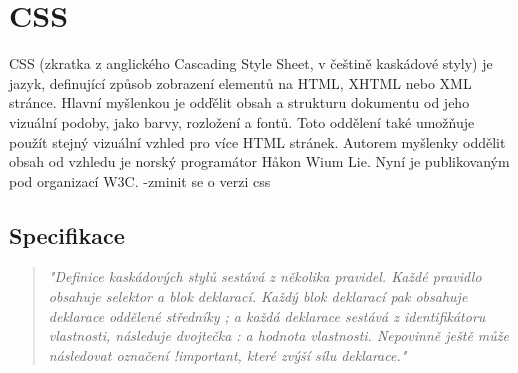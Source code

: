 \documentclass[main.tex]{subfiles}
\begin{document}
\section{CSS}
CSS (zkratka z anglického Cascading Style Sheet, v češtině kaskádové styly) je jazyk, definující způsob zobrazení elementů na HTML, XHTML nebo XML stránce. Hlavní myšlenkou je odďělit obsah a strukturu dokumentu od jeho vizuální podoby, jako barvy, rozložení a fontů. Toto oddělení také umožňuje použít stejný vizuální vzhled pro více HTML stránek. Autorem myšlenky oddělit obsah od vzhledu je norský programátor Håkon Wium Lie. Nyní je publikovaným pod organizací W3C. -zminit se o verzi css 

\subsection{Specifikace}
\begin{quote} \textit{"Definice kaskádových stylů sestává z několika pravidel. Každé pravidlo obsahuje selektor a blok deklarací. Každý blok deklarací pak obsahuje deklarace oddělené středníky ; a každá deklarace sestává z identifikátoru vlastnosti, následuje dvojtečka : a hodnota vlastnosti. Nepovinně ještě může následovat označení !important, které zvýší sílu deklarace."} \cite{web:wik:cz:css} \end{quote} 
\end{document}
